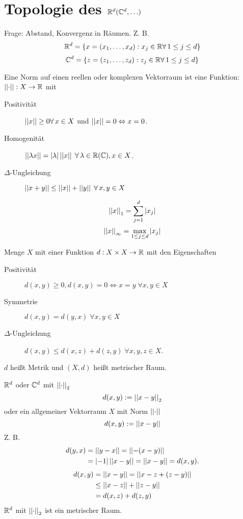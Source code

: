 \documentclass[../ana2.tex]{subfiles}
\begin{document}
\setcounter{section}{8}
\section{Topologie des \( \mathbb{R}^d (\mathbb{C}^d, \ldots) \)}
Frage: Abstand, Konvergenz in  
Räumen.
Z. B. 
\[ \R^d = \set{x = (x_1, \ldots, x_d) : 
x_j \in \R \forall 1 \leq j \leq d} \]
\[ \C^d = \set{z = (z_1, \ldots, z_d) : 
z_j \in \R \forall 1 \leq j \leq d} \]
\begin{defi}
    Eine Norm auf einen reellen oder komplexen Vektorraum
    ist eine Funktion: \( \left|\left|\cdot\right|\right|:X\rightarrow \mathbb{R} \) mit
    \begin{description}
        \item[Positivität] \( \norm{x} \geq 0 \forall x\in X \) 
        und \( \left|\left|x\right|\right| = 0 \Leftrightarrow x = 0 \).
        \item[Homogenität] \( \norm{\lambda x} = \abs{\lambda} \norm{x}
        \; \forall \lambda \in \R (\C), x\in X \).
        \item[\( \Delta \)-Ungleichung] \( \norm{x+y}
        \leq \norm{x} + \norm{y} \; \forall x,y \in X \)
    \end{description}
\end{defi}
\begin{bspe}
    \[ \left|\left|x\right|\right|_1 = \sum_{j=1}^d \left|x_j\right| \]
    \[ \left|\left|x\right|\right|_\infty 
    = \underset{1 \leq j \leq d}{\max} \left|x_j\right| \]
\end{bspe}
\begin{defi}
    Menge \(X\) mit einer Funktion \( d:X\times X\rightarrow \mathbb{R} \)
    mit den Eigenschaften
    \begin{description}
        \item[Positivität] \( d(x,y) \geq 0, d(x,y) = 0 \Leftrightarrow x=y
        \; \forall x,y \in X \)       
        \item[Symmetrie] \( d(x,y) = d(y,x) \; \forall x,y \in X \)
        \item[\( \Delta \)-Ungleichung] 
        \( d(x,y) \leq d(x,z) + d(z, y) 
        \; \forall x,y,z \in X \).
    \end{description}
    \(d\) heißt Metrik und \( (X, d) \) heißt metrischer 
    Raum.
\end{defi}
\begin{bsp}
    \( \mathbb{R}^d \) oder \( \mathbb{C}^d\) mit \(\left|\left|\cdot\right|\right|_2\)
    \[ d(x,y) := \left|\left|x-y\right|\right|_2 \]
    oder ein allgemeiner Vektorraum \(X\) mit Norm 
    \(\left|\left|\cdot\right|\right|\)
    \[ d(x,y) := \left|\left|x-y\right|\right| \]
    Z. B. 
    \begin{align*}
        d(y,x) &= \left|\left|y - x\right|\right| = \left|\left|-(x-y)\right|\right| \\
        &= \left|-1\right|\left|\left|x-y\right|\right| = \left|\left|x-y\right|\right| = d(x, y).
    \end{align*}
    \begin{align*}
        d(x,y) &= \left|\left|x-y\right|\right| = \left|\left|x-z + (z-y)\right|\right| \\
        &\leq \left|\left|x-z\right|\right| + \left|\left|z-y\right|\right| \\
        &= d(x,z) + d(z,y)
    \end{align*}
    \( \mathbb{R}^d \) mit \( \left|\left|\cdot\right|\right|_2 \) ist ein metrischer 
    Raum.
\end{bsp}
\end{document}
